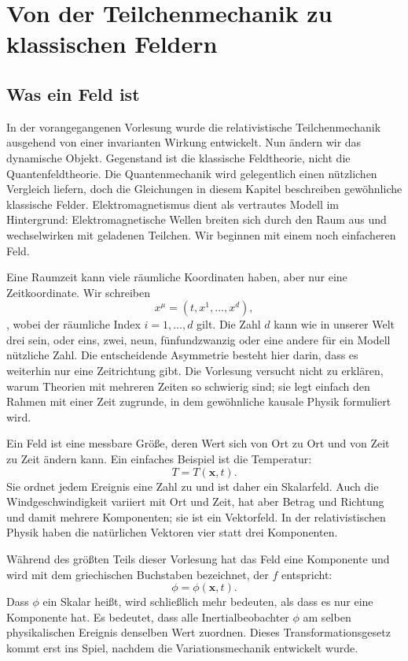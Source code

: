 \chapter{Von der Teilchenmechanik zu klassischen Feldern}

\section{Was ein Feld ist}

In der vorangegangenen Vorlesung wurde die relativistische Teilchenmechanik ausgehend von einer invarianten Wirkung entwickelt. Nun ändern wir das dynamische Objekt. Gegenstand ist die klassische Feldtheorie, nicht die Quantenfeldtheorie. Die Quantenmechanik wird gelegentlich einen nützlichen Vergleich liefern, doch die Gleichungen in diesem Kapitel beschreiben gewöhnliche klassische Felder. Elektromagnetismus dient als vertrautes Modell im Hintergrund: Elektromagnetische Wellen breiten sich durch den Raum aus und wechselwirken mit geladenen Teilchen. Wir beginnen mit einem noch einfacheren Feld.

Eine Raumzeit kann viele räumliche Koordinaten haben, aber nur eine Zeitkoordinate. Wir schreiben \begin{equation}
x^\mu=(t,x^1,\ldots,x^d),
\end{equation}, wobei der räumliche Index \(i=1,\ldots,d\) gilt. Die Zahl \(d\) kann wie in unserer Welt drei sein, oder eins, zwei, neun, fünfundzwanzig oder eine andere für ein Modell nützliche Zahl. Die entscheidende Asymmetrie besteht hier darin, dass es weiterhin nur eine Zeitrichtung gibt. Die Vorlesung versucht nicht zu erklären, warum Theorien mit mehreren Zeiten so schwierig sind; sie legt einfach den Rahmen mit einer Zeit zugrunde, in dem gewöhnliche kausale Physik formuliert wird.

Ein Feld ist eine messbare Größe, deren Wert sich von Ort zu Ort und von Zeit zu Zeit ändern kann. Ein einfaches Beispiel ist die Temperatur: \begin{equation}
T=T(\mathbf{x},t).
\end{equation} Sie ordnet jedem Ereignis eine Zahl zu und ist daher ein Skalarfeld. Auch die Windgeschwindigkeit variiert mit Ort und Zeit, hat aber Betrag und Richtung und damit mehrere Komponenten; sie ist ein Vektorfeld. In der relativistischen Physik haben die natürlichen Vektoren vier statt drei Komponenten.

Während des größten Teils dieser Vorlesung hat das Feld eine Komponente und wird mit dem griechischen Buchstaben bezeichnet, der \(f\) entspricht: \begin{equation}
\phi=\phi(\mathbf{x},t).
\label{eq:sr4-field-definition}
\end{equation} Dass \(\phi\) ein Skalar heißt, wird schließlich mehr bedeuten, als dass es nur eine Komponente hat. Es bedeutet, dass alle Inertialbeobachter \(\phi\) am selben physikalischen Ereignis denselben Wert zuordnen. Dieses Transformationsgesetz kommt erst ins Spiel, nachdem die Variationsmechanik entwickelt wurde.

